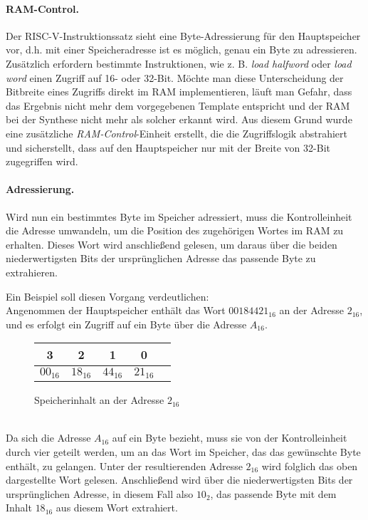 \paragraph{RAM-Control.} Der RISC-V-Instruktionssatz sieht eine Byte-Adressierung für den Hauptspeicher vor, d.h. mit einer Speicheradresse ist es möglich, genau ein Byte zu adressieren.
Zusätzlich erfordern bestimmte Instruktionen, wie z. B. \textit{load halfword} oder \textit{load word} einen Zugriff auf 16- oder 32-Bit.
Möchte man diese Unterscheidung der Bitbreite eines Zugriffs direkt im RAM implementieren, läuft man Gefahr, dass das Ergebnis nicht mehr dem vorgegebenen Template entspricht und der RAM bei der Synthese nicht mehr als solcher erkannt wird.
Aus diesem Grund wurde eine zusätzliche \textit{RAM-Control}-Einheit erstellt, die die Zugriffslogik abstrahiert und sicherstellt, dass auf den Hauptspeicher nur mit der Breite von 32-Bit zugegriffen wird.

\paragraph{Adressierung.} Wird nun ein bestimmtes Byte im Speicher adressiert, muss die Kontrolleinheit die Adresse umwandeln, um die Position des zugehörigen Wortes im RAM zu erhalten. 
Dieses Wort wird anschließend gelesen, um daraus über die beiden niederwertigsten Bits der ursprünglichen Adresse das passende Byte zu extrahieren.

Ein Beispiel soll diesen Vorgang verdeutlichen:\\
Angenommen der Hauptspeicher enthält das Wort $00184421_{16}$ an der Adresse $2_{16}$,
und es erfolgt ein Zugriff auf ein Byte über die Adresse $A_{16}$.
\begin{figure} [htpb]
    \centering
        \begin{tabular}{|c|c|c|c|c|}
            \multicolumn{1}{c}{3} & \multicolumn{1}{c}{2} &  \multicolumn{1}{c}{1}& \multicolumn{1}{c}{0}\\
            \hline
            $00_{16}$ & $18_{16}$ & $44_{16}$ & $21_{16}$\\
            \hline
        \end{tabular}
        \caption{Speicherinhalt an der Adresse $2_{16}$}
\end{figure}
\\                                                        
Da sich die Adresse $A_{16}$ auf ein Byte bezieht, muss sie von der Kontrolleinheit durch vier geteilt werden, um an das Wort im Speicher, das das gewünschte Byte enthält, zu gelangen.
Unter der resultierenden Adresse $2_{16}$ wird folglich das oben dargestellte Wort gelesen.
Anschließend wird über die niederwertigsten Bits der ursprünglichen Adresse, in diesem Fall also $10_2$, das passende Byte mit dem Inhalt $18_{16}$ aus diesem Wort extrahiert.

